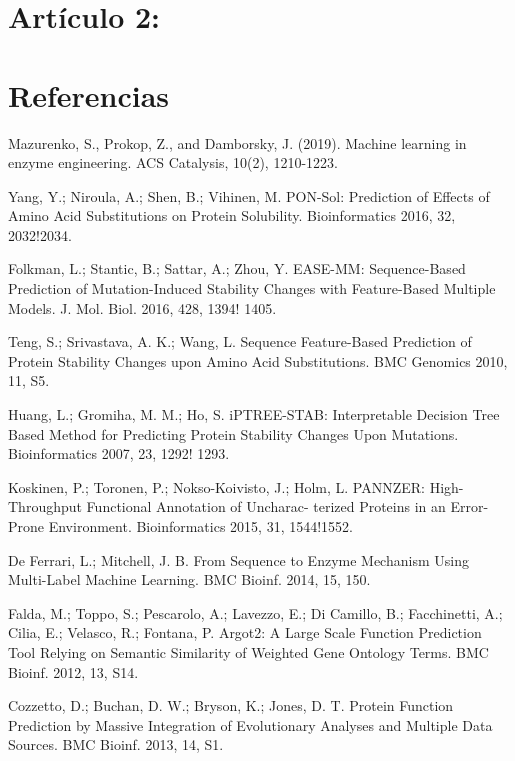 \documentclass[12pt]{article}
\begin{document}
\section{Artículo 2: }



\section{Referencias}

\begin{thebibliography}{20}
Mazurenko, S., Prokop, Z., and Damborsky, J. (2019). Machine learning in enzyme engineering. ACS Catalysis, 10(2), 1210-1223. 

 Yang, Y.; Niroula, A.; Shen, B.; Vihinen, M. PON-Sol: Prediction of Effects of Amino Acid Substitutions on Protein Solubility. Bioinformatics 2016, 32, 2032!2034.

 Folkman, L.; Stantic, B.; Sattar, A.; Zhou, Y. EASE-MM: Sequence-Based Prediction of Mutation-Induced Stability Changes with Feature-Based Multiple Models. J. Mol. Biol. 2016, 428, 1394! 1405.

 Teng, S.; Srivastava, A. K.; Wang, L. Sequence Feature-Based Prediction of Protein Stability Changes upon Amino Acid Substitutions. BMC Genomics 2010, 11, S5.

 Huang, L.; Gromiha, M. M.; Ho, S. iPTREE-STAB: Interpretable Decision Tree Based Method for Predicting Protein Stability Changes Upon Mutations. Bioinformatics 2007, 23, 1292! 1293.


 Koskinen, P.; Toronen, P.; Nokso-Koivisto, J.; Holm, L. PANNZER: High-Throughput Functional Annotation of Uncharac- terized Proteins in an Error-Prone Environment. Bioinformatics 2015, 31, 1544!1552.

 De Ferrari, L.; Mitchell, J. B. From Sequence to Enzyme Mechanism Using Multi-Label Machine Learning. BMC Bioinf. 2014, 15, 150.

 Falda, M.; Toppo, S.; Pescarolo, A.; Lavezzo, E.; Di Camillo, B.; Facchinetti, A.; Cilia, E.; Velasco, R.; Fontana, P. Argot2: A Large Scale Function Prediction Tool Relying on Semantic Similarity of Weighted Gene Ontology Terms. BMC Bioinf. 2012, 13, S14.

 Cozzetto, D.; Buchan, D. W.; Bryson, K.; Jones, D. T. Protein Function Prediction by Massive Integration of Evolutionary Analyses and Multiple Data Sources. BMC Bioinf. 2013, 14, S1.


\end{thebibliography}
\end{document}
